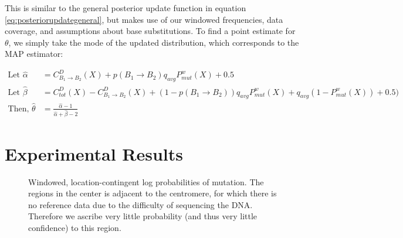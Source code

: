 \documentclass[10pt,letterpaper]{article}
\begin{document}
This is similar to the general posterior update function in equation \eqref{eq:posteriorupdategeneral}, but makes use of our windowed frequencies, data coverage, and assumptions about base substitutions. To find a 
point estimate for $\theta$, we simply take the mode of the updated distribution, which corresponds to the MAP estimator:

\begin{equation}
\begin{aligned}
    \text{Let } \hat{\alpha} &= C^D_{B_1 \rightarrow B_2}(X) + p(B_1 \rightarrow B_2) q_{avg} P^w_{mut}(X) + 0.5 \\
    \text{Let } \hat{\beta} &= C^D_{tot}(X) - C^D_{B_1 \rightarrow B_2}(X) + (1 - p(B_1 \rightarrow B_2)) q_{avg} P^w_{mut}(X) + q_{avg} (1 - P^w_{mut}(X)) + 0.5) \\
    \text{Then, } \hat{\theta} &= \frac{\hat{\alpha} - 1}{\hat{\alpha} + \hat{\beta} - 2} \label{eq:thetaestimator}
\end{aligned}
\end{equation}

\section{Experimental Results}

\begin{figure}[h]
\begin{center}
\end{center}
   \caption{\small Windowed, location-contingent log probabilities of mutation. The regions in the center is adjacent to the centromere, for which there is no reference data due to the difficulty of sequencing the DNA. Therefore we ascribe very little probability (and thus very little confidence) to this region.}
\label{fig:windowprobs}
\end{figure}
\end{document}
